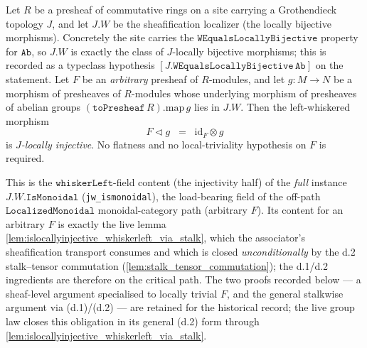 \begin{lemma}

  \label{lem:islocallyinjective_whisker_of_W}
  Let \(R\) be a presheaf of commutative rings on a site carrying a Grothendieck
  topology \(J\), and let \(J.W\) be the sheafification localizer (the locally
  bijective morphisms). Concretely the site carries the
  \(\mathtt{WEqualsLocallyBijective}\) property for \(\mathtt{Ab}\), so \(J.W\) is
  exactly the class of \(J\)-locally bijective morphisms; this is recorded as a
  typeclass hypothesis \([J.\mathtt{WEqualsLocallyBijective}\,\mathtt{Ab}]\) on
  the statement. Let \(F\) be an \emph{arbitrary} presheaf of
  \(R\)-modules, and let \(g : M \to N\) be a morphism of presheaves of
  \(R\)-modules whose underlying morphism of presheaves of abelian groups
  \((\mathtt{toPresheaf}\,R).\mathrm{map}\,g\) lies in \(J.W\). Then the
  left-whiskered morphism
  \[
    F \triangleleft g \;\;=\;\; \mathrm{id}_F \otimes g
  \]
  is \emph{\(J\)-locally injective}. No flatness and no local-triviality
  hypothesis on \(F\) is required.

  This is the \(\mathtt{whiskerLeft}\)-field content (the injectivity half) of the
  \emph{full} instance \(J.W.\mathtt{IsMonoidal}\) (\texttt{jw\_ismonoidal}), the
  load-bearing field of the off-path \(\mathtt{LocalizedMonoidal}\) monoidal-category
  path (arbitrary \(F\)). Its content for an arbitrary \(F\) is exactly the live lemma
  \cref{lem:islocallyinjective_whiskerleft_via_stalk}, which the associator's
  sheafification transport consumes and which is closed \emph{unconditionally} by the
  d.2 stalk--tensor commutation (\cref{lem:stalk_tensor_commutation}); the d.1/d.2
  ingredients are therefore on the critical path. The two proofs recorded below --- a
  sheaf-level argument specialised to locally trivial \(F\), and the general stalkwise
  argument via (d.1)/(d.2) --- are retained for the historical record; the live group
  law closes this obligation in its general (d.2) form through
  \cref{lem:islocallyinjective_whiskerleft_via_stalk}.
\end{lemma}

